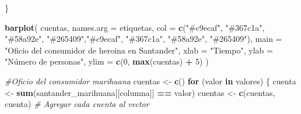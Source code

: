 \documentclass[
]{article}
\newenvironment{Shaded}{\begin{snugshade}}{\end{snugshade}}
\newcommand{\AttributeTok}[1]{\textcolor[rgb]{0.13,0.29,0.53}{#1}}
\newcommand{\CommentTok}[1]{\textcolor[rgb]{0.56,0.35,0.01}{\textit{#1}}}
\newcommand{\ControlFlowTok}[1]{\textcolor[rgb]{0.13,0.29,0.53}{\textbf{#1}}}
\newcommand{\DecValTok}[1]{\textcolor[rgb]{0.00,0.00,0.81}{#1}}
\newcommand{\FunctionTok}[1]{\textcolor[rgb]{0.13,0.29,0.53}{\textbf{#1}}}
\newcommand{\NormalTok}[1]{#1}
\newcommand{\OtherTok}[1]{\textcolor[rgb]{0.56,0.35,0.01}{#1}}
\newcommand{\SpecialCharTok}[1]{\textcolor[rgb]{0.81,0.36,0.00}{\textbf{#1}}}
\newcommand{\StringTok}[1]{\textcolor[rgb]{0.31,0.60,0.02}{#1}}
\begin{document}
\begin{Shaded}
\begin{Highlighting}[]
\NormalTok{\}}

\FunctionTok{barplot}\NormalTok{(}
\NormalTok{  cuentas,}
  \AttributeTok{names.arg =}\NormalTok{ etiquetas,}
  \AttributeTok{col =} \FunctionTok{c}\NormalTok{(}\StringTok{"\#c9ecaf"}\NormalTok{, }\StringTok{"\#367c1a"}\NormalTok{, }\StringTok{"\#58a92e"}\NormalTok{, }\StringTok{"\#265409"}\NormalTok{,}\StringTok{"\#c9ecaf"}\NormalTok{, }\StringTok{"\#367c1a"}\NormalTok{, }\StringTok{"\#58a92e"}\NormalTok{, }\StringTok{"\#265409"}\NormalTok{),}
  \AttributeTok{main =} \StringTok{"Oficio del consumidor de heroina en Santander"}\NormalTok{,}
  \AttributeTok{xlab =} \StringTok{"Tiempo"}\NormalTok{,}
  \AttributeTok{ylab =} \StringTok{"Número de personas"}\NormalTok{,}
  \AttributeTok{ylim =} \FunctionTok{c}\NormalTok{(}\DecValTok{0}\NormalTok{, }\FunctionTok{max}\NormalTok{(cuentas) }\SpecialCharTok{+} \DecValTok{5}\NormalTok{)}
\NormalTok{)}

\CommentTok{\#Oficio del consumidor marihuana }
\NormalTok{cuentas }\OtherTok{\textless{}{-}} \FunctionTok{c}\NormalTok{()}
\ControlFlowTok{for}\NormalTok{ (valor }\ControlFlowTok{in}\NormalTok{ valores) \{}
\NormalTok{  cuenta }\OtherTok{\textless{}{-}} \FunctionTok{sum}\NormalTok{(santander\_marihuana[[columna]] }\SpecialCharTok{==}\NormalTok{ valor)}
\NormalTok{  cuentas }\OtherTok{\textless{}{-}} \FunctionTok{c}\NormalTok{(cuentas, cuenta)  }\CommentTok{\# Agregar cada cuenta al vector}
  

\end{Highlighting}
\end{Shaded}
\end{document}
